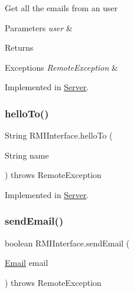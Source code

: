 Get all the emails from an user 
\begin{DoxyParams}{Parameters}
{\em user} & \\
\hline
\end{DoxyParams}
\begin{DoxyReturn}{Returns}

\begin{DoxyItemize}
\item 
\end{DoxyItemize}
\end{DoxyReturn}

\begin{DoxyExceptions}{Exceptions}
{\em Remote\+Exception} & \\
\hline
\end{DoxyExceptions}


Implemented in \hyperlink{class_server_a348f49650335ef5341a4d960d6adac2e}{Server}.

\mbox{\label{interface_r_m_i_interface_a44a3680b28462fce581d362dbc6cf1db}} 
\subsubsection{\texorpdfstring{hello\+To()}{helloTo()}}
{\footnotesize\ttfamily String R\+M\+I\+Interface.\+hello\+To (\begin{DoxyParamCaption}\item[{String}]{name }\end{DoxyParamCaption}) throws Remote\+Exception}



Implemented in \hyperlink{class_server_a5bb8a4d74a82c7e2590de523648fa3ab}{Server}.

\mbox{\label{interface_r_m_i_interface_ad86e01382cdb0cb8a64710a7e9102524}} 
\subsubsection{\texorpdfstring{send\+Email()}{sendEmail()}}
{\footnotesize\ttfamily boolean R\+M\+I\+Interface.\+send\+Email (\begin{DoxyParamCaption}\item[{\hyperlink{class_email}{Email}}]{email }\end{DoxyParamCaption}) throws Remote\+Exception}

